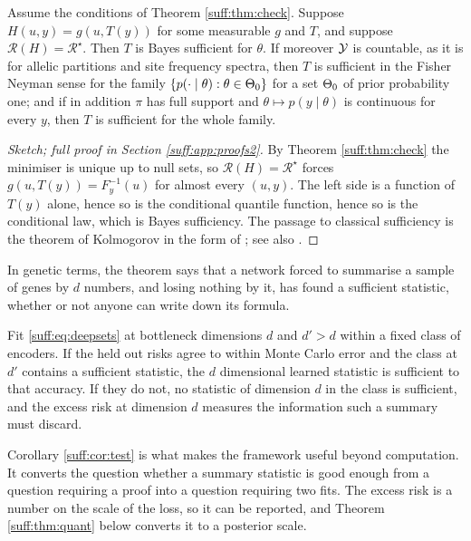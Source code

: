 \begin{theorem}
\label{suff:thm:suff}
Assume the conditions of Theorem \ref{suff:thm:check}. Suppose $H(u,y)=g(u,T(y))$ for some
measurable $g$ and $T$, and suppose $\mathcal{R}(H)=\mathcal{R}^\star$. Then $T$ is Bayes
sufficient for $\theta$. If moreover $\mathcal{Y}$ is countable, as it is for allelic partitions and
site frequency spectra, then $T$ is sufficient in the Fisher Neyman sense for the family
$\{p(\cdot\mid\theta):\theta\in\Theta_0\}$ for a set $\Theta_0$ of prior probability one; and if in
addition $\pi$ has full support and $\theta\mapsto p(y\mid\theta)$ is continuous for every
$y$, then $T$ is sufficient for the whole family.
\end{theorem}

\begin{proof}[Sketch; full proof in Section \ref{suff:app:proofs2}]
By Theorem \ref{suff:thm:check} the minimiser is unique up to null sets, so
$\mathcal{R}(H)=\mathcal{R}^\star$ forces $g(u,T(y)) = F^{-1}_{y}(u)$ for almost every
$(u,y)$. The left side is a function of $T(y)$ alone, hence so is the conditional quantile
function, hence so is the conditional law, which is Bayes sufficiency. The passage to
classical sufficiency is the theorem of Kolmogorov in the form of \citet{suff:halmossavage1949};
see also \citet[Theorem 2.14]{suff:schervish1995}.
\end{proof}

In genetic terms, the theorem says that a network forced to summarise a sample of genes by
$d$ numbers, and losing nothing by it, has found a sufficient statistic, whether or not anyone
can write down its formula.

\begin{corollary}
\label{suff:cor:test}
Fit \eqref{suff:eq:deepsets} at bottleneck dimensions $d$ and $d' > d$ within a fixed class of
encoders. If the held out risks agree to within Monte Carlo error and the class at $d'$ contains a sufficient statistic, the $d$ dimensional learned
statistic is sufficient to that accuracy. If they do not, no statistic of dimension $d$ in the
class is sufficient, and the excess risk at dimension $d$ measures the information such a
summary must discard.
\end{corollary}

Corollary \ref{suff:cor:test} is what makes the framework useful beyond computation. It
converts the question whether a summary statistic is good enough from a question requiring a
proof into a question requiring two fits. The excess risk is a number on the scale of the
loss, so it can be reported, and Theorem \ref{suff:thm:quant} below converts it to a posterior
scale.

